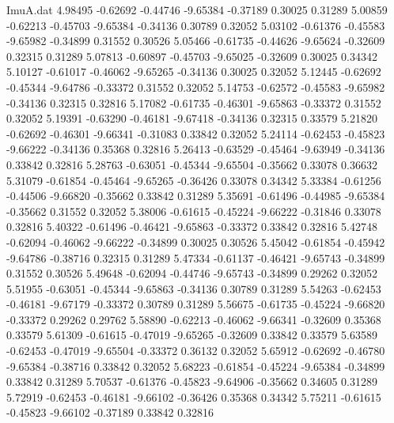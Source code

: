 \begin{filecontents}{ImuA.dat}
   4.98495   -0.62692   -0.44746   -9.65384   -0.37189    0.30025    0.31289
   5.00859   -0.62213   -0.45703   -9.65384   -0.34136    0.30789    0.32052
   5.03102   -0.61376   -0.45583   -9.65982   -0.34899    0.31552    0.30526
   5.05466   -0.61735   -0.44626   -9.65624   -0.32609    0.32315    0.31289
   5.07813   -0.60897   -0.45703   -9.65025   -0.32609    0.30025    0.34342
   5.10127   -0.61017   -0.46062   -9.65265   -0.34136    0.30025    0.32052
   5.12445   -0.62692   -0.45344   -9.64786   -0.33372    0.31552    0.32052
   5.14753   -0.62572   -0.45583   -9.65982   -0.34136    0.32315    0.32816
   5.17082   -0.61735   -0.46301   -9.65863   -0.33372    0.31552    0.32052
   5.19391   -0.63290   -0.46181   -9.67418   -0.34136    0.32315    0.33579
   5.21820   -0.62692   -0.46301   -9.66341   -0.31083    0.33842    0.32052
   5.24114   -0.62453   -0.45823   -9.66222   -0.34136    0.35368    0.32816
   5.26413   -0.63529   -0.45464   -9.63949   -0.34136    0.33842    0.32816
   5.28763   -0.63051   -0.45344   -9.65504   -0.35662    0.33078    0.36632
   5.31079   -0.61854   -0.45464   -9.65265   -0.36426    0.33078    0.34342
   5.33384   -0.61256   -0.44506   -9.66820   -0.35662    0.33842    0.31289
   5.35691   -0.61496   -0.44985   -9.65384   -0.35662    0.31552    0.32052
   5.38006   -0.61615   -0.45224   -9.66222   -0.31846    0.33078    0.32816
   5.40322   -0.61496   -0.46421   -9.65863   -0.33372    0.33842    0.32816
   5.42748   -0.62094   -0.46062   -9.66222   -0.34899    0.30025    0.30526
   5.45042   -0.61854   -0.45942   -9.64786   -0.38716    0.32315    0.31289
   5.47334   -0.61137   -0.46421   -9.65743   -0.34899    0.31552    0.30526
   5.49648   -0.62094   -0.44746   -9.65743   -0.34899    0.29262    0.32052
   5.51955   -0.63051   -0.45344   -9.65863   -0.34136    0.30789    0.31289
   5.54263   -0.62453   -0.46181   -9.67179   -0.33372    0.30789    0.31289
   5.56675   -0.61735   -0.45224   -9.66820   -0.33372    0.29262    0.29762
   5.58890   -0.62213   -0.46062   -9.66341   -0.32609    0.35368    0.33579
   5.61309   -0.61615   -0.47019   -9.65265   -0.32609    0.33842    0.33579
   5.63589   -0.62453   -0.47019   -9.65504   -0.33372    0.36132    0.32052
   5.65912   -0.62692   -0.46780   -9.65384   -0.38716    0.33842    0.32052
   5.68223   -0.61854   -0.45224   -9.65384   -0.34899    0.33842    0.31289
   5.70537   -0.61376   -0.45823   -9.64906   -0.35662    0.34605    0.31289
   5.72919   -0.62453   -0.46181   -9.66102   -0.36426    0.35368    0.34342
   5.75211   -0.61615   -0.45823   -9.66102   -0.37189    0.33842    0.32816

\end{filecontents}
